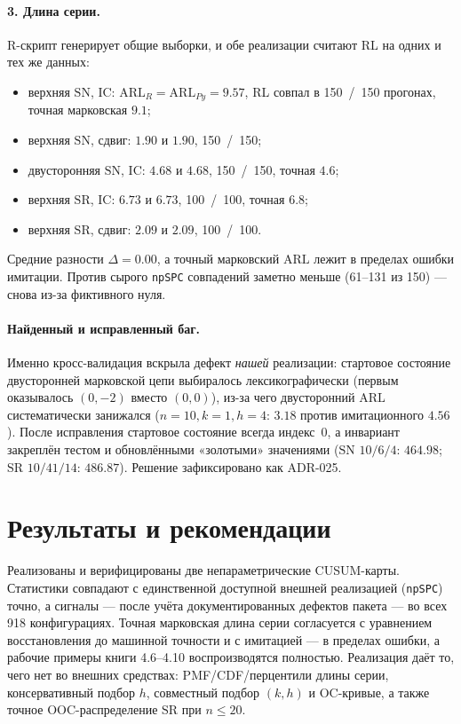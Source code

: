 \documentclass[11pt,a4paper]{article}
\newcommand{\SN}{\mathrm{SN}}
\newcommand{\SR}{\mathrm{SR}}
\newcommand{\ARL}{\mathrm{ARL}}
\begin{document}
\paragraph{3. Длина серии.} R-скрипт генерирует общие выборки, и обе
реализации считают RL на одних и тех же данных:
\begin{itemize}
  \item верхняя $\SN$, IC: $\ARL_R = \ARL_{Py} = 9.57$, RL совпал в
        150~/~150 прогонах, точная марковская $9.1$;
  \item верхняя $\SN$, сдвиг: $1.90$ и $1.90$, 150~/~150;
  \item двусторонняя $\SN$, IC: $4.68$ и $4.68$, 150~/~150, точная $4.6$;
  \item верхняя $\SR$, IC: $6.73$ и $6.73$, 100~/~100, точная $6.8$;
  \item верхняя $\SR$, сдвиг: $2.09$ и $2.09$, 100~/~100.
\end{itemize}
Средние разности $\Delta=0.00$, а точный марковский $\ARL$ лежит в
пределах ошибки имитации. Против сырого \texttt{npSPC} совпадений заметно
меньше (61--131 из 150) --- снова из-за фиктивного нуля.

\paragraph{Найденный и исправленный баг.} Именно кросс-валидация вскрыла
дефект \emph{нашей} реализации: стартовое состояние двусторонней марковской
цепи выбиралось лексикографически (первым оказывалось $(0,-2)$ вместо
$(0,0)$), из-за чего двусторонний $\ARL$ систематически занижался
($n=10,k=1,h=4$: $3.18$ против имитационного $4.56$). После исправления
стартовое состояние всегда индекс~$0$, а инвариант закреплён тестом и
обновлёнными «золотыми» значениями ($\SN$ $10/6/4$: $464.98$;
$\SR$ $10/41/14$: $486.87$). Решение зафиксировано как ADR-025.

\section{Результаты и рекомендации}
\label{sec:results}

Реализованы и верифицированы две непараметрические CUSUM-карты.
Статистики совпадают с единственной доступной внешней реализацией
(\texttt{npSPC}) точно, а сигналы --- после учёта документированных
дефектов пакета --- во всех 918 конфигурациях. Точная марковская длина
серии согласуется с уравнением восстановления до машинной точности и с
имитацией --- в пределах ошибки, а рабочие примеры книги 4.6--4.10
воспроизводятся полностью. Реализация даёт то, чего нет во внешних
средствах: PMF/CDF/перцентили длины серии, консервативный подбор $h$,
совместный подбор $(k,h)$ и OC-кривые, а также точное OOC-распределение
$\SR$ при $n\le20$.
\end{document}
